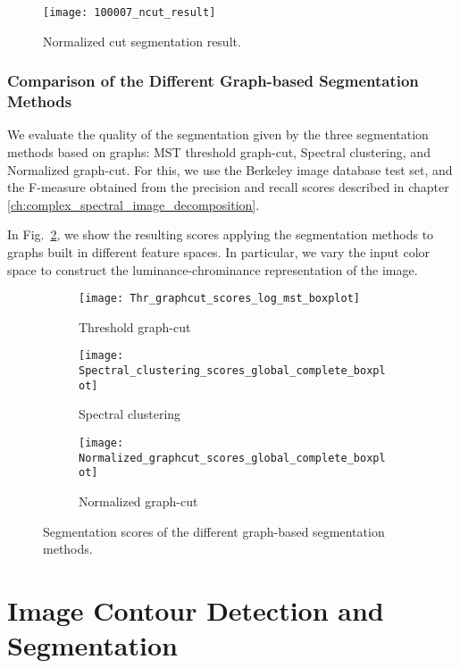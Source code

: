 \begin{figure}[!ht]
    \centering
  	\texttt{[image: 100007\_ncut\_result]}
    \caption{Normalized cut segmentation result.}
    \label{fig:norm_cut_segm_result}    
\end{figure}


\subsubsection{Comparison of the Different Graph-based Segmentation Methods}
We evaluate the quality of the segmentation given by the three segmentation methods based on graphs: MST threshold graph-cut, Spectral clustering, and Normalized graph-cut. For this, we use the Berkeley image database test set, and the F-measure obtained from the precision and recall scores described in chapter \ref{ch:complex_spectral_image_decomposition}. 

In Fig.\ \ref{fig:boxplot_score_methods}, we show the resulting scores applying the segmentation methods to graphs built in different feature spaces. In particular, we vary the input color space to construct the luminance-chrominance representation of the image.

\begin{figure}[!ht]
    \centering
    \begin{subfigure}[b]{0.49\textwidth}
        \texttt{[image: Thr\_graphcut\_scores\_log\_mst\_boxplot]}
        \caption{Threshold graph-cut}
    \end{subfigure}     
    \begin{subfigure}[b]{0.49\textwidth}
    	\centering
    	\texttt{[image: Spectral\_clustering\_scores\_global\_complete\_boxplot]}
        \caption{Spectral clustering}
    \end{subfigure}     
    \begin{subfigure}[b]{0.49\textwidth}
    	\centering
        \texttt{[image: Normalized\_graphcut\_scores\_global\_complete\_boxplot]}
        \caption{Normalized graph-cut}
    \end{subfigure} 
        	    
    \caption{Segmentation scores of the different graph-based segmentation methods.}\label{fig:boxplot_score_methods}    
\end{figure}

\section{Image Contour Detection and Segmentation}

